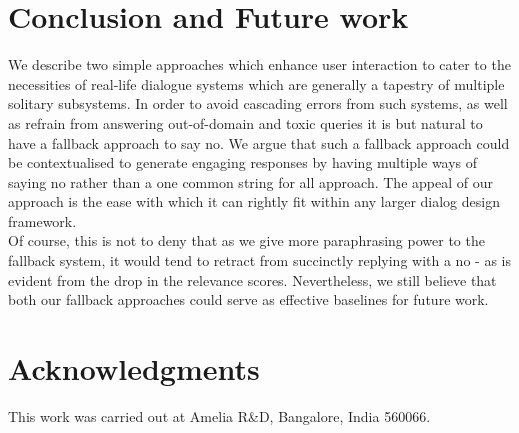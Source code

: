\documentclass[11pt,a4paper]{article}
\begin{document}
\section{Conclusion and Future work}
We describe two simple approaches which enhance user interaction to cater to the necessities of real-life dialogue systems which are generally a tapestry of multiple solitary subsystems. In order to avoid cascading errors from such systems, as well as refrain from answering out-of-domain and toxic queries it is but natural to have a fallback approach to say no. We argue that such a fallback approach could be contextualised to generate engaging responses by having multiple ways of saying no rather than a one common string for all approach. The appeal of our approach is the ease with which it can rightly fit within any larger dialog design framework.\\
\indent Of course, this is not to deny that as we give more paraphrasing power to the fallback system, it would tend to retract from succinctly replying with a no - as is evident from the drop in the relevance scores. Nevertheless, we still believe that both our fallback approaches could serve as effective baselines for future work. 

\section{Acknowledgments}
This work was carried out at Amelia R\&D, Bangalore, India 560066.


\end{document}
